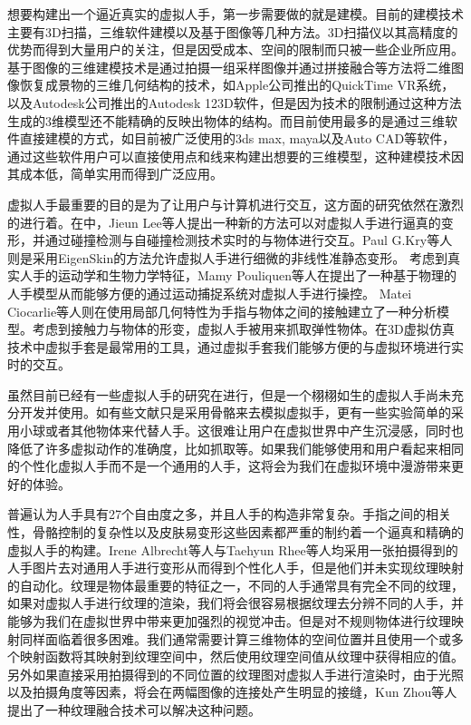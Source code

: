想要构建出一个逼近真实的虚拟人手，第一步需要做的就是建模。目前的建模技术主要有3D扫描，三维软件建模以及基于图像等几种方法。3D扫描仪以其高精度的优势而得到大量用户的关注，但是因受成本、空间的限制而只被一些企业所应用。基于图像的三维建模技术是通过拍摄一组采样图像并通过拼接融合等方法将二维图像恢复成景物的三维几何结构的技术，如Apple公司推出的QuickTime VR系统，以及Autodesk公司推出的Autodesk 123D软件，但是因为技术的限制通过这种方法生成的3维模型还不能精确的反映出物体的结构。而目前使用最多的是通过三维软件直接建模的方式，如目前被广泛使用的3ds
max, maya以及Auto CAD等软件，通过这些软件用户可以直接使用点和线来构建出想要的三维模型，这种建模技术因其成本低，简单实用而得到广泛应用。

虚拟人手最重要的目的是为了让用户与计算机进行交互，这方面的研究依然在激烈的进行着。在\cite{Jieun06}中，Jieun
Lee等人提出一种新的方法可以对虚拟人手进行逼真的变形，并通过碰撞检测与自碰撞检测技术实时的与物体进行交互。Paul
G.Kry等人则是采用EigenSkin的方法允许虚拟人手进行细微的非线性准静态变形\cite{Kry02}。
考虑到真实人手的运动学和生物力学特征，Mamy
Pouliquen等人在\cite{Mamy06}提出了一种基于物理的人手模型从而能够方便的通过运动捕捉系统对虚拟人手进行操控。
Matei
Ciocarlie等人则在\cite{Mate07}使用局部几何特性为手指与物体之间的接触建立了一种分析模型。考虑到接触力与物体的形变\cite{Tongcui08,Kchui02}，虚拟人手被用来抓取弹性物体。在3D虚拟仿真技术中虚拟手套是最常用的工具，通过虚拟手套我们能够方便的与虚拟环境进行实时的交互\cite{Huagen09,Chin05,Wenzhen11,Hanan12}。

虽然目前已经有一些虚拟人手的研究在进行，但是一个栩栩如生的虚拟人手尚未充分开发并使用。如有些文献只是采用骨骼来去模拟虚拟手，更有一些实验简单的采用小球或者其他物体来代替人手。这很难让用户在虚拟世界中产生沉浸感，同时也降低了许多虚拟动作的准确度，比如抓取等。如果我们能够使用和用户看起来相同的个性化虚拟人手而不是一个通用的人手，这将会为我们在虚拟环境中漫游带来更好的体验。

普遍认为人手具有27个自由度之多，并且人手的构造非常复杂。手指之间的相关性，骨骼控制的复杂性以及皮肤易变形这些因素都严重的制约着一个逼真和精确的虚拟人手的构建。Irene
Albrecht等人\cite{Irene03}与Taehyun
Rhee等人\cite{Rhee06}均采用一张拍摄得到的人手图片去对通用人手进行变形从而得到个性化人手，但是他们并未实现纹理映射的自动化。纹理是物体最重要的特征之一，不同的人手通常具有完全不同的纹理，如果对虚拟人手进行纹理的渲染，我们将会很容易根据纹理去分辨不同的人手，并能够为我们在虚拟世界中带来更加强烈的视觉冲击。但是对不规则物体进行纹理映射同样面临着很多困难。我们通常需要计算三维物体的空间位置并且使用一个或多个映射函数将其映射到纹理空间中，然后使用纹理空间值从纹理中获得相应的值\cite{Tomas02}。另外如果直接采用拍摄得到的不同位置的纹理图对虚拟人手进行渲染时，由于光照以及拍摄角度等因素，将会在两幅图像的连接处产生明显的接缝，Kun
Zhou等人提出了一种纹理融合技术可以解决这种问题\cite{Kun05}。

